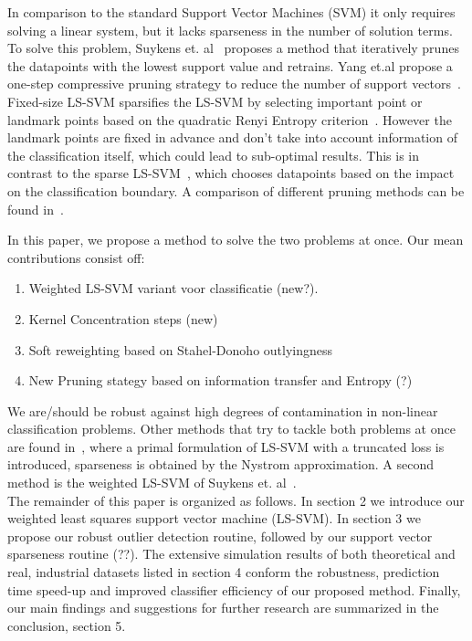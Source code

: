 \documentclass[preprint,12pt]{elsarticle}
\begin{document}
In comparison to the standard Support Vector Machines (SVM) it only requires solving a linear system, but it lacks sparseness in the number of solution terms. To solve this problem, Suykens et. al~\cite{suykens2000sparse} proposes a method that iteratively prunes the datapoints with the lowest support value and retrains. Yang et.al propose a one-step compressive pruning strategy to reduce the number of support vectors~\cite{yang2014sparse}. Fixed-size LS-SVM sparsifies the LS-SVM by selecting important point or landmark points based on the quadratic Renyi Entropy criterion~\cite{suykens2002least}. However the landmark points are fixed in advance and don't take into account information of the classification itself, which could lead to sub-optimal results. This is in contrast to the sparse LS-SVM~\cite{suykens2000sparse}, which chooses datapoints based on the impact on the classification boundary. A comparison of different pruning methods can be found in~\cite{hoegaerts2004comparison}. 

In this paper, we propose a method to solve the two problems at once.
Our mean contributions consist off:
\begin{enumerate}
	\item Weighted LS-SVM variant voor classificatie (new?).
	\item Kernel Concentration steps (new)
	\item Soft reweighting based on Stahel-Donoho outlyingness
	\item New Pruning stategy based on information transfer and Entropy (?)
\end{enumerate}
We are/should be robust against high degrees of contamination in non-linear classification problems. Other methods that try to tackle both problems at once are found in~\cite{chen2018sparse}, where a primal formulation of LS-SVM with a truncated loss is introduced, sparseness is obtained by the Nystrom approximation. A second method is the weighted LS-SVM of Suykens et. al~\cite{suykens2002weighted}. \\

The remainder of this paper is organized as follows. In section 2 we introduce our weighted least squares support vector machine (LS-SVM). In section 3 we propose our robust outlier detection routine, followed by our support vector sparseness routine (??). The extensive simulation results of both theoretical and real, industrial datasets listed in section 4 conform the robustness, prediction time speed-up and improved classifier efficiency of our proposed method. Finally, our main findings and suggestions for further research are summarized in the conclusion, section 5. 
\end{document}
